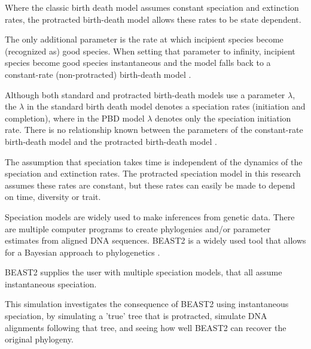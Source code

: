 

Where the classic birth death model assumes constant speciation and extinction
 rates, the protracted birth-death model allows these rates to be state
 dependent.

The only additional parameter is the rate at which incipient species become
(recognized as) good species.
When setting that parameter to infinity, incipient species become good
species instantaneous and the model falls back to a constant-rate (non-protracted) birth-death model .


Although both standard and protracted birth-death models use a parameter 
$\lambda$, the $\lambda$ in the standard birth death model denotes
a speciation rates (initiation and completion), where in the PBD model
$\lambda$ denotes only the speciation initiation rate. 
There is no relationship known between the parameters of the constant-rate
birth-death model and the protracted birth-death model \cite{etienne2014estimating} 
.


The assumption that speciation takes time is independent of the dynamics
of the speciation and extinction rates.
The protracted speciation model in this research assumes these rates are
constant, but these rates can easily be made to depend on time, diversity
or trait.


Speciation models are widely used to make inferences from genetic data.
There are multiple computer programs to create phylogenies and/or parameter
estimates from aligned DNA sequences.
BEAST2 is a widely used tool that allows for a Bayesian approach to 
phylogenetics \cite{bouckaert2014beast}.

BEAST2 supplies the user with multiple speciation models, that all assume
instantaneous speciation.
 

This simulation investigates the consequence of BEAST2 using instantaneous
speciation, by simulating a 'true' tree that is protracted, simulate DNA
alignments following that tree, and seeing how well BEAST2 can recover
the original phylogeny.
 

